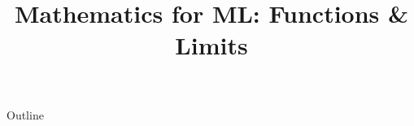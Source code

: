 \documentclass[xcolor=dvipsnames,compress,t,pdf,9pt]{beamer}
\title[\insertframenumber /\inserttotalframenumber]{Mathematics for ML: Functions \& Limits}
\begin{document}
	\begin{frame}
	\titlepage
	\end{frame}

	\begin{frame}{Outline}
	    \tableofcontents
	\end{frame}

	
	
	
	
\end{document}
